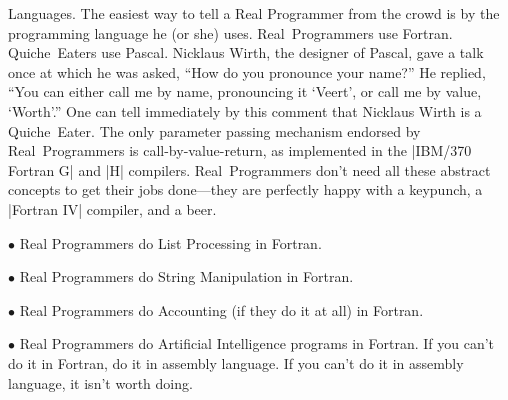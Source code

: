 \sect Languages.
The easiest way to tell a Real Programmer from the crowd is by the
programming language he (or she) uses. Real~Programmers use
Fortran. Quiche~Eaters use Pascal. Nicklaus Wirth, the designer of
Pascal, gave a talk once at which he was asked, ``How do you pronounce
your name?'' He replied, ``You can either call me by name, pronouncing
it `Veert', or call me by value, `Worth'.'' One can tell immediately by
this comment that Nicklaus Wirth is a Quiche~Eater. The only parameter
passing mechanism endorsed by Real~Programmers is
call-by-value-return, as implemented in the |IBM/370 Fortran G| and |H|
compilers. Real~Programmers don't need all these abstract concepts to
get their jobs done---they are perfectly happy with a keypunch, a
|Fortran IV| compiler, and a beer.
\startlist
\item{$\bullet$} Real Programmers do List Processing in Fortran.
\item{$\bullet$} Real Programmers do String Manipulation in Fortran.
\item{$\bullet$} Real Programmers do Accounting (if they do it at all) in Fortran.
\item{$\bullet$} Real Programmers do Artificial Intelligence programs in Fortran.
\endlist
If you can't do it in Fortran, do it in assembly language. If you
can't do it in assembly language, it isn't worth doing.

